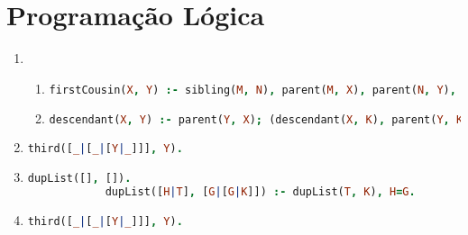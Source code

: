 \documentclass{article}
\begin{document}
\section{Programação Lógica}

\begin{enumerate}
    \item
        \begin{enumerate}[label=(\alph*)]
            \item
                \begin{lstlisting}[language=Prolog]
                    firstCousin(X, Y) :- sibling(M, N), parent(M, X), parent(N, Y), not(X=Y), not(sibling(X, Y)).
                \end{lstlisting}
            \item
                \begin{lstlisting}[language=Prolog]
                    descendant(X, Y) :- parent(Y, X); (descendant(X, K), parent(Y, K)).
                \end{lstlisting}
        \end{enumerate}
    \item

        \begin{lstlisting}[language=Prolog]
            third([_|[_|[Y|_]]], Y).
        \end{lstlisting}
    \item
        \begin{lstlisting}[language=Prolog]
            dupList([], []).
            dupList([H|T], [G|[G|K]]) :- dupList(T, K), H=G.
        \end{lstlisting}
    \item
        \begin{lstlisting}[language=Prolog]
            third([_|[_|[Y|_]]], Y).
        \end{lstlisting}
\end{enumerate}
    
\end{document}
